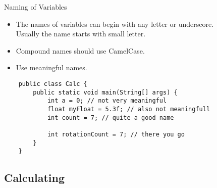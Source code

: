 \begin{frame}[fragile]{Naming of Variables}
	\begin{itemize}
		\item The names of variables can begin with any letter or underscore. \\
		Usually the name starts with small letter.
		\item Compound names should use CamelCase.
		\item Use meaningful names.
	\end{itemize}
	\begin{lstlisting}
	public class Calc {
	    public static void main(String[] args) {
	    	int a = 0; // not very meaningful
	    	float myFloat = 5.3f; // also not meaningfull
	    	int count = 7; // quite a good name

	    	int rotationCount = 7; // there you go
	    }
	}
	\end{lstlisting}
\end{frame}

\subsection{Calculating}

